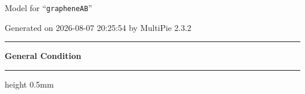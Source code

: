 \documentclass[fleqn,10pt,landscape]{jsarticle}
\begin{document}
\setcounter{MaxMatrixCols}{32}

\renewcommand{\tablename}{Table~}
\renewcommand{\figurename}{Figure~}
\setlength{\baselineskip}{16pt}
\setlength{\parindent}{0pt}
\setlength{\mathindent}{0pt}
\footnotesize
\begin{center}
\LARGE
Model for ``\texttt{grapheneAB}''
\end{center}
\begin{flushright}
Generated on 2026-08-07 20:25:54 by MultiPie 2.3.2
\end{flushright}
\setlength{\baselineskip}{16pt}
\footnotesize
\vspace{5mm}
\noindent \rule[0.5mm]{5mm}{0.5mm}\hspace{3mm}\textbf{General Condition}\hspace{3mm}\leaders\hrule height 0.5mm\hfill\kern0pt
\vspace{3mm}
\end{document}
